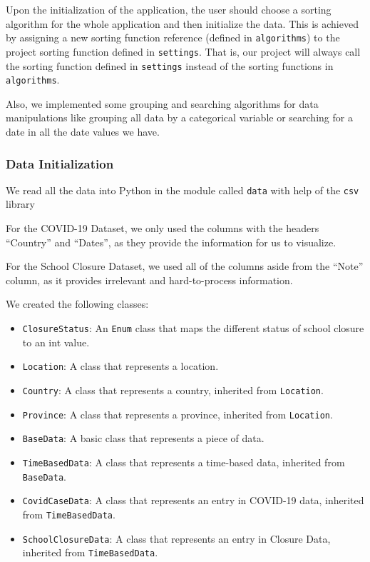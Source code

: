 \documentclass[fontsize=11pt]{article}
\begin{document}
    Upon the initialization of the application, the user should choose a sorting algorithm for the whole application and then initialize the data. This is achieved by assigning a new sorting function reference (defined in \verb|algorithms|) to the project sorting function defined in \verb|settings|. That is, our project will always call the sorting function defined in \verb|settings| instead of the sorting functions in \verb|algorithms|.

    Also, we implemented some grouping and searching algorithms for data manipulations like grouping all data by a categorical variable or searching for a date in all the date values we have.

    \subsubsection{Data Initialization}

    We read all the data into Python in the module called \verb|data| with help of the \verb|csv| library 

    For the COVID-19 Dataset, we only used the columns with the headers ``Country'' and ``Dates'', as they provide the information for us to visualize.

    For the School Closure Dataset, we used all of the columns aside from the ``Note'' column, as it provides irrelevant and hard-to-process information.

    We created the following classes:

    \begin{itemize}
        \item \verb|ClosureStatus|: An \verb|Enum| class that maps the different status of school closure to an int value.
        \item \verb|Location|: A class that represents a location.
        \item \verb|Country|: A class that represents a country, inherited from \verb|Location|.
        \item \verb|Province|: A class that represents a province, inherited from \verb|Location|.
        \item \verb|BaseData|: A basic class that represents a piece of data.
        \item \verb|TimeBasedData|: A class that represents a time-based data, inherited from \verb|BaseData|.
        \item \verb|CovidCaseData|: A class that represents an entry in COVID-19 data, inherited from \verb|TimeBasedData|.
        \item \verb|SchoolClosureData|: A class that represents an entry in Closure Data, inherited from \verb|TimeBasedData|.
    \end{itemize}
\end{document}
